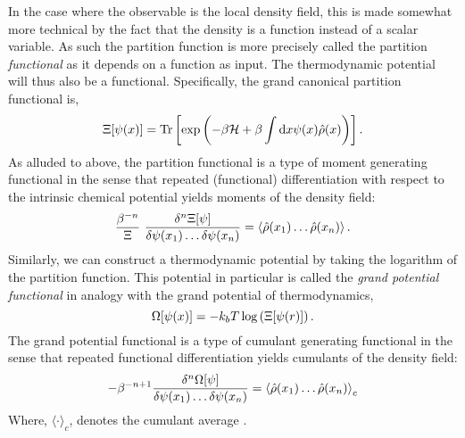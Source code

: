 In the case where the observable is the local density field, this is made somewhat
more technical by the fact that the density is a function instead of a scalar
variable.  As such the partition function is more precisely called the
partition \textit{functional} as it depends on a function as input. The
thermodynamic potential will thus also be a functional.  Specifically, the grand
canonical partition functional is,
%
\begin{equation}
    \Xi[\psi(x)] = \mathrm{Tr}\left[ \exp\left(-\beta\mathcal{H} +\beta\int\mathrm{d}x
        \psi(x) \hat{\rho}(x)\right) \right].
\end{equation}
%
As alluded to above, the partition functional is a type of moment generating
functional in the sense that repeated (functional) differentiation with respect 
to  the intrinsic  chemical potential yields moments of the density field:
%
\begin{equation}
    \frac{\beta^{-n}}{\Xi}\,\, \frac{\delta^n \Xi[\psi]}{\delta \psi(x_1) \dots \delta\psi(x_n)} 
        = \left\langle \hat{\rho}(x_1)\dots\hat{\rho}(x_n) \right\rangle.
\end{equation}
%
Similarly, we can construct a thermodynamic potential by taking the logarithm
of the partition function. This potential in particular is called the
\textit{grand potential functional} in analogy with the grand potential of
thermodynamics,
%
\begin{equation}
    \Omega[\psi(x)] = -k_bT\log\left(\Xi[\psi(r)]\right).
\end{equation}
%
The grand potential functional is a type of cumulant generating functional in
the sense that repeated functional differentiation yields cumulants of the
density field:
%
\begin{equation}
    -\beta^{-n + 1} \frac{\delta^n\Omega[\psi]}{\delta\psi(x_1)\dots\delta\psi(x_n)}
        = \left\langle \hat{\rho}(x_1)\dots\hat{\rho}(x_n) \right\rangle_c
\end{equation}
%
Where, $\langle \cdot \rangle_c$, denotes the cumulant average \cite{KUBO62}.

